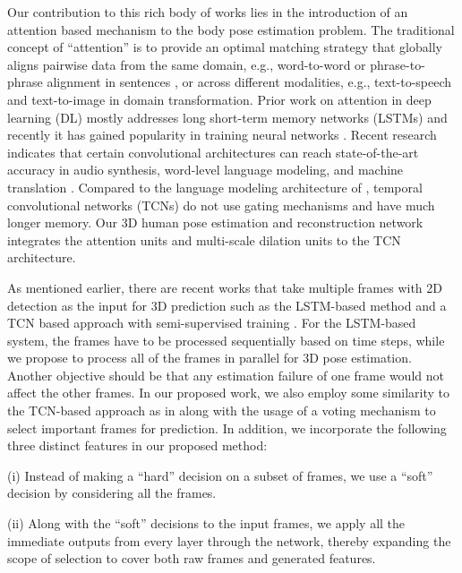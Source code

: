 \documentclass[twocolumn]{svjour3}          \smartqed  \usepackage{graphicx}
\begin{document}
Our contribution to this rich body of works lies in the introduction of an attention based mechanism to the body pose estimation problem. The traditional concept of “attention” is to provide an optimal matching strategy that globally aligns pairwise data from the same domain, e.g., word-to-word or phrase-to-phrase alignment in sentences \citep{Yao2013}, or across different modalities, e.g., text-to-speech \citep{Chorowski2015} and text-to-image \citep{Xu2015} in domain transformation. Prior work on attention in deep learning (DL) mostly addresses long short-term memory networks (LSTMs) \citep{Hochreiter1997} and recently it has gained popularity in training neural networks \citep{Yin2016}. Recent research indicates that certain convolutional architectures can reach state-of-the-art accuracy in audio synthesis, word-level language modeling, and machine translation \citep{oord2016wavenet, kalchbrenner2016neural, dauphin2017language}. Compared to the language modeling architecture of \citep{dauphin2017language}, temporal convolutional networks (TCNs) \citep{bai2018empirical} do not use gating mechanisms and have much longer memory. Our 3D human pose estimation and reconstruction network integrates the attention units and multi-scale dilation units to the TCN architecture.

As mentioned earlier, there are recent works that take multiple frames with 2D detection as the input for 3D prediction such as the LSTM-based method \citep{Hossain2018} and a TCN based approach with semi-supervised training \citep{Pavllo2019}. For the LSTM-based system, the frames have to be processed sequentially based on time steps, while we propose to process all of the frames in parallel for 3D pose estimation. Another objective should be that any estimation failure of one frame would not affect the other frames. In our proposed work, we also employ some similarity to the TCN-based approach as in \citep{Pavllo2019, chen2020anatomy, liu2020gast} along with the usage of a voting mechanism to select important frames for prediction. In addition, we incorporate the following three distinct features in our proposed method:

(i) Instead of making a ``hard'' decision on a subset of frames, we use a ``soft'' decision by considering all the frames. 

(ii) Along with the ``soft'' decisions to the input frames, we apply all the immediate outputs from every layer through the network, thereby expanding the scope of selection to cover both raw frames and generated features.
\end{document}
